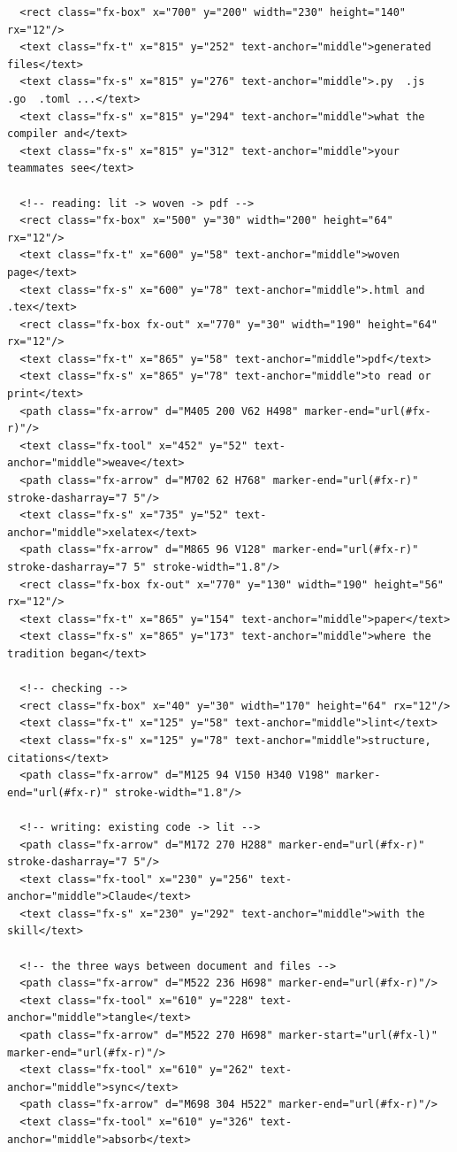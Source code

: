 \documentclass[10pt,a4paper]{article}
\begin{document}
\begin{Verbatim}
  <rect class="fx-box" x="700" y="200" width="230" height="140" rx="12"/>
  <text class="fx-t" x="815" y="252" text-anchor="middle">generated files</text>
  <text class="fx-s" x="815" y="276" text-anchor="middle">.py  .js  .go  .toml ...</text>
  <text class="fx-s" x="815" y="294" text-anchor="middle">what the compiler and</text>
  <text class="fx-s" x="815" y="312" text-anchor="middle">your teammates see</text>

  <!-- reading: lit -> woven -> pdf -->
  <rect class="fx-box" x="500" y="30" width="200" height="64" rx="12"/>
  <text class="fx-t" x="600" y="58" text-anchor="middle">woven page</text>
  <text class="fx-s" x="600" y="78" text-anchor="middle">.html and .tex</text>
  <rect class="fx-box fx-out" x="770" y="30" width="190" height="64" rx="12"/>
  <text class="fx-t" x="865" y="58" text-anchor="middle">pdf</text>
  <text class="fx-s" x="865" y="78" text-anchor="middle">to read or print</text>
  <path class="fx-arrow" d="M405 200 V62 H498" marker-end="url(#fx-r)"/>
  <text class="fx-tool" x="452" y="52" text-anchor="middle">weave</text>
  <path class="fx-arrow" d="M702 62 H768" marker-end="url(#fx-r)" stroke-dasharray="7 5"/>
  <text class="fx-s" x="735" y="52" text-anchor="middle">xelatex</text>
  <path class="fx-arrow" d="M865 96 V128" marker-end="url(#fx-r)" stroke-dasharray="7 5" stroke-width="1.8"/>
  <rect class="fx-box fx-out" x="770" y="130" width="190" height="56" rx="12"/>
  <text class="fx-t" x="865" y="154" text-anchor="middle">paper</text>
  <text class="fx-s" x="865" y="173" text-anchor="middle">where the tradition began</text>

  <!-- checking -->
  <rect class="fx-box" x="40" y="30" width="170" height="64" rx="12"/>
  <text class="fx-t" x="125" y="58" text-anchor="middle">lint</text>
  <text class="fx-s" x="125" y="78" text-anchor="middle">structure, citations</text>
  <path class="fx-arrow" d="M125 94 V150 H340 V198" marker-end="url(#fx-r)" stroke-width="1.8"/>

  <!-- writing: existing code -> lit -->
  <path class="fx-arrow" d="M172 270 H288" marker-end="url(#fx-r)" stroke-dasharray="7 5"/>
  <text class="fx-tool" x="230" y="256" text-anchor="middle">Claude</text>
  <text class="fx-s" x="230" y="292" text-anchor="middle">with the skill</text>

  <!-- the three ways between document and files -->
  <path class="fx-arrow" d="M522 236 H698" marker-end="url(#fx-r)"/>
  <text class="fx-tool" x="610" y="228" text-anchor="middle">tangle</text>
  <path class="fx-arrow" d="M522 270 H698" marker-start="url(#fx-l)" marker-end="url(#fx-r)"/>
  <text class="fx-tool" x="610" y="262" text-anchor="middle">sync</text>
  <path class="fx-arrow" d="M698 304 H522" marker-end="url(#fx-r)"/>
  <text class="fx-tool" x="610" y="326" text-anchor="middle">absorb</text>


\end{Verbatim}
\end{document}
